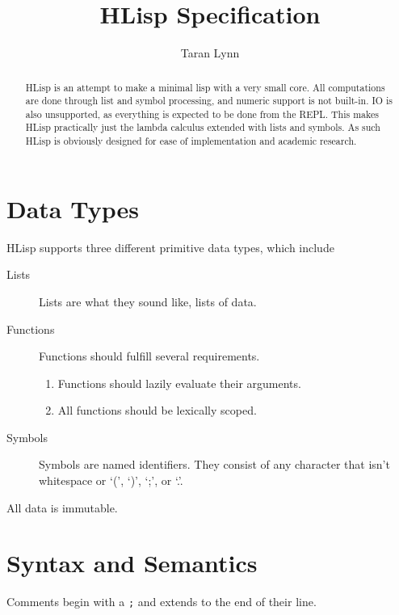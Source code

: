 \documentclass[12pt]{article}
\title{HLisp Specification}
\author{Taran Lynn}
\begin{document}
\maketitle

\begin{abstract}
  HLisp is an attempt to make a minimal lisp with a very small core. All
  computations are done through list and symbol processing, and numeric support
  is not built-in. IO is also unsupported, as everything is expected to be done
  from the REPL. This makes HLisp practically just the lambda calculus extended
  with lists and symbols. As such HLisp is obviously designed for ease of
  implementation and academic research.
\end{abstract}

\tableofcontents

\pagebreak



\section{Data Types}

HLisp supports three different primitive data types, which include

\begin{description}
\item[Lists] Lists are what they sound like, lists of data.

\item[Functions] Functions should fulfill several requirements.
  \begin{enumerate}
  \item Functions should lazily evaluate their arguments.

  \item All functions should be lexically scoped.
  \end{enumerate}

\item[Symbols] Symbols are named identifiers. They consist of any character that
  isn't whitespace or `(', `)', `;', or `.'.
\end{description}

All data is immutable.

\section{Syntax and Semantics}

Comments begin with a \verb!;! and extends to the end of their line.
\end{document}
